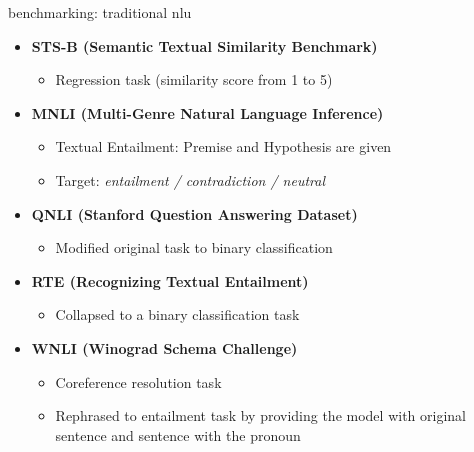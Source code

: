 \begin{vbframe}{benchmarking: traditional nlu}

\vfill

\begin{itemize}
	\item \textbf{STS-B (Semantic Textual Similarity Benchmark)}
	\begin{itemize}
		\item Regression task (similarity score from 1 to 5)
	\end{itemize}
	\item \textbf{MNLI (Multi-Genre Natural Language Inference)} 
	\begin{itemize}
		\item Textual Entailment: Premise and Hypothesis are given
		\item Target: \textit{entailment / contradiction / neutral}
	\end{itemize}
	\item \textbf{QNLI (Stanford Question Answering Dataset)}
	\begin{itemize}
		\item Modified original task to binary classification
	\end{itemize}
	\item \textbf{RTE (Recognizing Textual Entailment)} 
	\begin{itemize}
		\item Collapsed to a binary classification task 
	\end{itemize}
	\item \textbf{WNLI (Winograd Schema Challenge)} 
	\begin{itemize}
		\item Coreference resolution task
		\item Rephrased to entailment task by providing the model with original sentence and sentence with the pronoun  
	\end{itemize}
\end{itemize}

\vfill

\end{vbframe}



